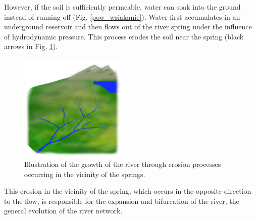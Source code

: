 \documentclass[]{pracamgr}
\begin{document}
    However, if the soil is sufficiently permeable, water can soak into the ground instead of running off (Fig. \ref{pow_wsiakanie}). Water first accumulates in an underground reservoir and then flows out of the river spring under the influence of hydrodynamic pressure. This process erodes the soil near the spring (black arrows in Fig. \ref{zrodlo}).

    \begin{figure}
      \begin{center}
        \vspace{-20pt}
        \includegraphics[width=0.45\textwidth]{figs/erosion_illustration.png}
      \end{center}
      \vspace{-20pt}
      \caption{Illustration of the growth of the river through erosion processes occurring in the vicinity of the springs.}
      \vspace{0pt}
      \label{zrodlo}
    \end{figure}

    This erosion in the vicinity of the spring, which occurs in the opposite direction to the flow, is responsible for the expansion and bifurcation of the river, the general evolution of the river network.
\end{document}
